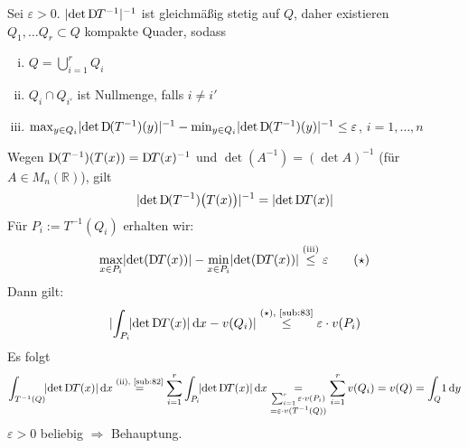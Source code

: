 Sei $\varepsilon>0$. $\lvert\det \mathrm{D}\mkern-1.5mu T ^{-1}\rvert ^{-1} $ ist gleichmäßig stetig auf $Q$, daher existieren $Q_1, \ldots Q_r \subset Q$ kompakte Quader, sodass 
\begin{enumerate}[(i)]
	\item $Q = \bigcup_{i=1}^r Q_i$
	\item $Q_i \cap Q_{i'}$ ist Nullmenge, falls $i \not= i'$
	\item $\max_{y \in Q_i} \lvert\det \mathrm{D}\mkern-1.5mu (T ^{-1})(y)\rvert ^{-1} - \min_{y \in Q_i} \lvert\det \mathrm{D}\mkern-1.5mu (T ^{-1})(y)\rvert ^{-1} \le \varepsilon$, \quad $i=1,\ldots ,n$
\end{enumerate}
Wegen $\mathrm{D}\mkern-1.5mu( T ^{-1})( T(x)) = \mathrm{D}\mkern-1.5mu T(x) ^{-1}$ und $\det (A ^{-1}) = (\det A) ^{-1}$ (für $A \in M_n(\mathds{R})$), gilt 
\[
	\lvert\det \mathrm{D}\mkern-1.5mu (T ^{-1}) \big( T(x)\big) \rvert ^{-1} =  \lvert\det \mathrm{D}\mkern-1.5mu T(x)\rvert
\]
Für $P_i := T ^{-1}(Q_i)$ erhalten wir: 
\[
	\max_{x \in P_i} \lvert\det ( \mathrm{D}\mkern-1.5mu T(x))\rvert - \min_{x \in P_i} \lvert\det ( \mathrm{D}\mkern-1.5mu T(x))\rvert \stackrel{\text{(iii)}}{\le} \varepsilon \tag{$\star$}
\]
Dann gilt:
\[
	\lvert\int_{P_i}\! \lvert\det \mathrm{D}\mkern-1.5mu T(x)\rvert  \, \mathrm{d}x  - v(Q_i)\rvert \stackrel{\text{($\star$), \ref{sub:83}}}{\le} \varepsilon \cdot v(P_i)
\]
Es folgt
\begin{align*}
	\int_{T ^{-1}(Q)}\! \lvert\det \mathrm{D}\mkern-1.5mu T(x)\rvert  \, \mathrm{d}x \stackrel{\text{(ii), \ref{sub:82}}}{=} \sum_{i=1}^{r} \int_{P_i}\! \lvert\det \mathrm{D}\mkern-1.5mu T(x)\rvert  \, \mathrm{d}x 
	\underset{\substack{\sum_{i=1}^{r} \varepsilon \cdot v(P_i) \\= \varepsilon \cdot v(T ^{-1}(Q)) }}{=} \sum_{i=1}^{r} v(Q_i) = v(Q) = \int_{Q} \! 1  \, \mathrm{d}y 
\end{align*}  
$\varepsilon>0$ beliebig $\Rightarrow $ Behauptung. \bewende

